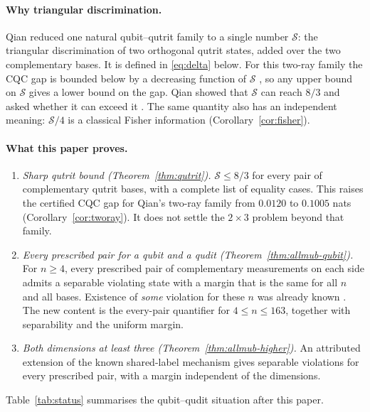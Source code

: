 \documentclass[11pt,a4paper]{article}
\numberwithin{equation}{section}
\theoremstyle{remark}\newtheorem{remark}[theorem]{Remark}
\begin{document}
\paragraph{Why triangular discrimination.}
Qian reduced one natural qubit--qutrit family to a single number $\mathcal S$: the triangular discrimination of two orthogonal qutrit states, added over the two complementary bases. It is defined in \eqref{eq:delta} below. For this two-ray family the CQC gap is bounded below by a decreasing function of $\mathcal S$ \cite[Theorem~6.3]{qian}, so any upper bound on $\mathcal S$ gives a lower bound on the gap. Qian showed that $\mathcal S$ can reach $8/3$ and asked whether it can exceed it \cite[Section~11(4)]{qian}. The same quantity also has an independent meaning: $\mathcal S/4$ is a classical Fisher information (Corollary~\ref{cor:fisher}).

\paragraph{What this paper proves.}
\begin{enumerate}[leftmargin=*,itemsep=2pt]
\item \emph{Sharp qutrit bound (Theorem~\ref{thm:qutrit}).} $\mathcal S\le8/3$ for every pair of complementary qutrit bases, with a complete list of equality cases. This raises the certified CQC gap for Qian's two-ray family from $0.0120$ to $0.1005$ nats (Corollary~\ref{cor:tworay}). It does not settle the $2\times3$ problem beyond that family.
\item \emph{Every prescribed pair for a qubit and a qudit (Theorem~\ref{thm:allmub-qubit}).} For $n\ge4$, every prescribed pair of complementary measurements on each side admits a separable violating state with a margin that is the same for all $n$ and all bases. Existence of \emph{some} violation for these $n$ was already known \cite{qian}. The new content is the every-pair quantifier for $4\le n\le163$, together with separability and the uniform margin.
\item \emph{Both dimensions at least three (Theorem~\ref{thm:allmub-higher}).} An attributed extension of the known shared-label mechanism gives separable violations for every prescribed pair, with a margin independent of the dimensions.
\end{enumerate}
Table~\ref{tab:status} summarises the qubit--qudit situation after this paper.
\end{document}
